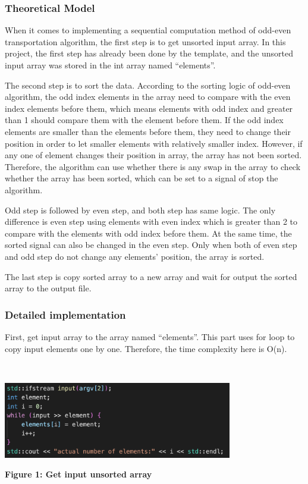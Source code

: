 \subsubsection{Theoretical Model}

When it comes to implementing a sequential computation method of odd-even transportation algorithm, the first step is to get unsorted input array. In this project, the first step has already been done by the template, and the unsorted input array was stored in the int array named “elements”.

The second step is to sort the data. According to the sorting logic of odd-even algorithm, the odd index elements in the array need to compare with the even index elements before them, which means elements with odd index and greater than 1 should compare them with the element before them. If the odd index elements are smaller than the elements before them, they need to change their position in order to let smaller elements with relatively smaller index. However, if any one of element changes their position in array, the array has not been sorted. Therefore, the algorithm can use whether there is any swap in the array to check whether the array has been sorted, which can be set to a signal of stop the algorithm.

Odd step is followed by even step, and both step has same logic. The only difference is even step using elements with even index which is greater than 2 to compare with the elements with odd index before them. At the same time, the sorted signal can also be changed in the even step. Only when both of even step and odd step do not change any elements’ position, the array is sorted.

The last step is copy sorted array to a new array and wait for output the sorted array to the output file.

\subsubsection{Detailed implementation}

First, get input array to the array named “elements”. This part uses for loop to copy input elements one by one. Therefore, the time complexity here is O(n).

~\\
\centerline {\includegraphics[scale = 1, width=10cm]{input}}
\centerline{\textbf {Figure 1: Get input unsorted array}}

